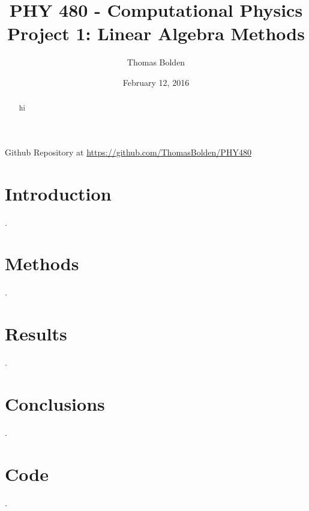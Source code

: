 \documentclass[11pt]{article}
\title{PHY 480 - Computational Physics \\ Project 1: Linear Algebra Methods}
\author{Thomas Bolden}
\date{February 12, 2016}
\begin{document}
\maketitle

\centerline{Github Repository at \href{https://github.com/ThomasBolden/PHY480}{https://github.com/ThomasBolden/PHY480}}

\begin{abstract}

    hi

\end{abstract}

\tableofcontents

\pagebreak

\section{Introduction}

    .

\section{Methods}

    .

\section{Results}

    .

\section{Conclusions}

    .

\section{Code}

    .

\begin{thebibliography}{1}


\end{thebibliography}
\end{document}
